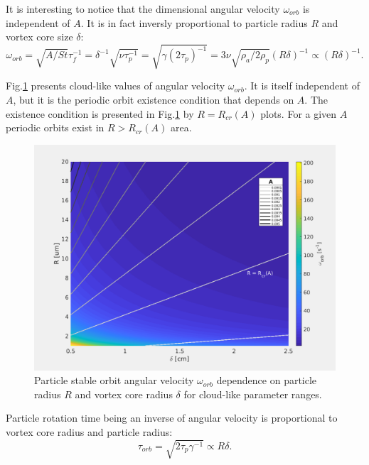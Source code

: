 \documentclass[../main.tex]{subfiles}
\begin{document}
It is interesting to notice that the dimensional angular velocity $\omega_{orb}$ is independent of $A$. It is in fact inversly proportional to particle radius $R$ and vortex core size $\delta$:
\begin{equation}
\omega_{orb}=\sqrt{A/St} \tau_f^{-1}=\delta^{-1} \sqrt{\nu \tau_p^{-1}}=\sqrt{\gamma(2\tau_p)^{-1}}=3 \nu \sqrt{\rho_a /2 \rho_p} (R \delta)^{-1} \propto (R \delta)^{-1}.
\label{ch3:eq20}
\end{equation}

Fig.\ref{fig:ch3_3b} presents cloud-like values of angular velocity $\omega_{orb}$. It is itself independent of $A$, but it is the periodic orbit existence condition that depends on $A$. The existence condition is presented in Fig.\ref{fig:ch3_3b} by  $R=R_{cr}(A)$ plots. For a given $A$ periodic orbits exist in  $R>R_{cr}(A)$ area.

\begin{figure}
\centering
\noindent \includegraphics[width=30pc]{gfx/orbit_vel_vs_R_and_delta.png}
\caption{Particle stable orbit angular velocity $\omega_{orb}$ dependence on particle radius $R$ and vortex core radius $\delta$ for cloud-like parameter ranges.}
\label{fig:ch3_3b}
\end{figure}

Particle rotation time being an inverse of angular velocity is proportional to vortex core radius and particle radius:
\begin{equation}
\tau_{orb}=\sqrt{2 \tau_p \gamma^{-1}} \propto R \delta.
\label{ch3:eq21}
\end{equation}
\end{document}
